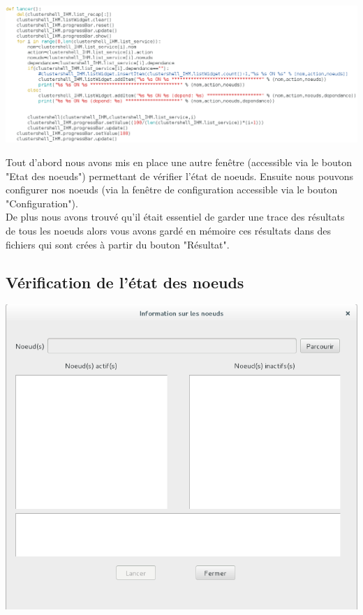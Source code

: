 \documentclass[a4paper,11pt]{article}
\begin{document}
\includegraphics[scale=0.45]{def_lancer.png} 





\noindent Tout d'abord nous avons mis en place une autre fenêtre (accessible via le bouton "Etat des noeuds") permettant de vérifier l'état de noeuds. Ensuite nous pouvons configurer nos noeuds (via la fenêtre de configuration accessible via le bouton "Configuration").\\
De plus nous avons trouvé qu'il était essentiel de garder une trace des résultats de tous les noeuds alors vous avons gardé en mémoire ces résultats dans des fichiers qui sont crées à partir du bouton "Résultat".

\subsection{Vérification de l'état des noeuds}

\begin{center}
\includegraphics[scale=0.6]{fen_etat_noeud.png} 
\end{center}
\end{document}

